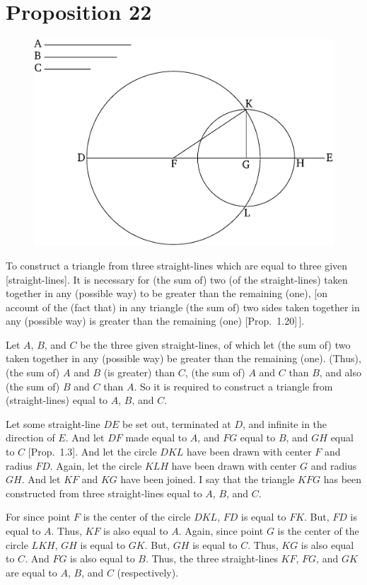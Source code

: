 \chapter*{Proposition 22}
\label{prop:22}

\begin{figure}[ht]
    \begin{center}
    \includegraphics[width=0.5\linewidth]{figures/fig22e.eps}
    \label{fig:prop_22}
    \end{center}
\end{figure}

To construct a triangle from three straight-lines which are equal to three given [straight-lines]. It is necessary for (the sum of) two (of the straight-lines) taken together in any (possible way) to be greater than the remaining (one), [on account of the (fact that)
 in any triangle (the sum of) two sides taken together in any (possible way) is greater than the remaining (one) [Prop.~1.20]\,].

Let $A$, $B$, and $C$ be the three given straight-lines, of which let (the sum of) two taken together in any (possible way)
be greater than the remaining (one). (Thus), (the sum of) $A$ and $B$ (is greater) than $C$, (the sum of) $A$ and $C$ than $B$,
and also (the sum of) $B$ and $C$ than $A$. So it is required to construct a triangle
from (straight-lines) equal to $A$, $B$, and $C$.

Let some straight-line $DE$ be set out, terminated at $D$, and infinite in the
direction of $E$.  And let $DF$ made equal to $A$, and $FG$
equal to $B$, and $GH$ equal to $C$ [Prop.~1.3]. And let the
circle $DKL$ have been drawn with center $F$ and radius $FD$. Again,
let the circle $KLH$ have been drawn with center $G$ and radius $GH$. And
let $KF$ and $KG$ have been joined. I say that the triangle $KFG$ has been
constructed from three straight-lines equal to $A$, $B$, and $C$.

For since point $F$ is the center of the circle $DKL$, $FD$ is equal to $FK$.
But, $FD$ is equal to $A$. Thus, $KF$ is also equal to $A$. Again, since point
$G$ is the center of the circle $LKH$, $GH$ is equal to $GK$. But, $GH$ is equal
to $C$. Thus, $KG$ is also equal to $C$. And $FG$ is also equal to $B$. Thus,
the three straight-lines $KF$, $FG$, and $GK$ are equal to $A$, $B$, and $C$ (respectively).

